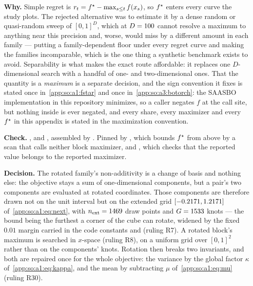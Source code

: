 \textbf{Why.} Simple regret is $r_t=f^\star-\max_{s\le t}f(x_s)$, so $f^\star$
enters every curve the study plots. The rejected alternative was to estimate it
by a dense random or quasi-random sweep of ${[0,1]}^D$, which at
$D=100$ cannot resolve a maximum to anything near this precision and,
worse, would miss by a different amount in each family --- putting a
family-dependent floor under every regret curve and making the families
incomparable, which is the one thing a synthetic benchmark exists to avoid.
Separability is what makes the exact route affordable: it replaces one
$D$-dimensional search with a handful of one- and two-dimensional ones. That
the quantity is a \emph{maximum} is a separate decision, and the sign
convention it fixes is stated once in~\ref{app:so:a1:fstar} and once
in~\ref{app:so:a3:botorch}: the SAASBO implementation in this repository
minimizes, so a caller negates $f$ at the call site, but nothing inside
 is ever negated, and every share, every maximizer and every
$f^\star$ in this appendix is stated in the maximization convention.

\begin{sloppypar}
\textbf{Check.} , 
and , assembled by
. Pinned by
, which bounds
$f^\star$ from above by a scan that calls neither block maximizer, and
, which checks that the reported value belongs
to the reported maximizer.
\end{sloppypar}

\label{app:so:a4:d2}

\textbf{Decision.} The rotated family's non-additivity is a change of basis and
nothing else: the objective stays a sum of one-dimensional components, but a
pair's two components are evaluated at rotated coordinates. Those components
are therefore drawn not on the unit interval but on the extended grid
$[-0.2171,1.2171]$ of~\eqref{app:so:a1:eq:next}, with $n_{\mathrm{ext}}=1469$
draw points and $G=1533$ knots --- the bound being the furthest
a corner of the cube can rotate, widened by the fixed $0.01$ margin carried in
the code constants  and 
(ruling R7). A rotated block's maximum is searched in $x$-space (ruling R8), on
a uniform grid over ${[0,1]}^2$ rather than on the components' knots. Rotation
then breaks two invariants, and both are repaired once for the whole objective:
the variance by the global factor $\kappa$ of~\eqref{app:so:a1:eq:kappa}, and
the mean by subtracting $\mu$ of~\eqref{app:so:a1:eq:mu} (ruling R30).

